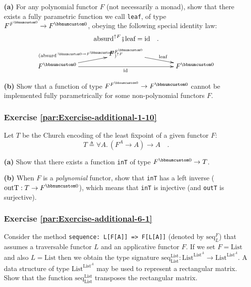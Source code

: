 \textbf{(a)} For any polynomial functor $F$ (not necessarily a monad),
show that there exists a fully parametric function we call \lstinline!leaf!,
of type $F^{F^{\bbnum 0}}\rightarrow F^{\bbnum 0}$, obeying the following
special identity law:
\[
\text{absurd}^{\uparrow F}\bef\text{leaf}=\text{id}\quad.
\]
\[
\xymatrix{\xyScaleY{0.3pc}\xyScaleX{3.5pc} & F^{F^{\bbnum 0}}\ar[rd]\sp(0.5){\ \text{leaf}}\\
F^{\bbnum 0}\ar[ru]\sp(0.5){(\text{absurd}^{:\bbnum 0\rightarrow F^{\bbnum 0}})^{\uparrow F}\ \ }\ar[rr]\sb(0.5){\text{id}\,} &  & F^{\bbnum 0}
}
\]

\textbf{(b)} Show that a function of type $F^{F^{\bbnum 0}}\rightarrow F^{\bbnum 0}$
cannot be implemented fully parametrically for some non-polynomial
functors $F$.

\subsubsection{Exercise \label{par:Exercise-additional-1-10}\ref{par:Exercise-additional-1-10}}

Let $T$ be the Church encoding of the least fixpoint of a given functor
$F$:
\[
T\triangleq\forall A.\,(F^{A}\rightarrow A)\rightarrow A\quad.
\]

\textbf{(a)} Show that there exists a function \lstinline!inT! of
type $F^{\bbnum 0}\rightarrow T$.

\textbf{(b)} When $F$ is a \emph{polynomial} functor, show that \lstinline!inT!
has a left inverse ($\text{outT}:T\rightarrow F^{\bbnum 0}$), which
means that \lstinline!inT! is injective (and \lstinline!outT! is
surjective).

\subsubsection{Exercise \label{par:Exercise-additional-6-1}\ref{par:Exercise-additional-6-1}}

Consider the method \lstinline!sequence: L[F[A]] => F[L[A]]! (denoted
by $\text{seq}_{L}^{F}$) that assumes a traversable functor $L$
and an applicative functor $F$. If we set $F=\text{List}$ and also
$L=\text{List}$ then we obtain the type signature $\text{seq}_{\text{List}}^{\text{List}}:\text{List}^{\text{List}^{A}}\rightarrow\text{List}^{\text{List}^{A}}$.
A data structure of type $\text{List}^{\text{List}^{A}}$ may be used
to represent a rectangular matrix. Show that the function $\text{seq}_{\text{List}}^{\text{List}}$
transposes the rectangular matrix.

